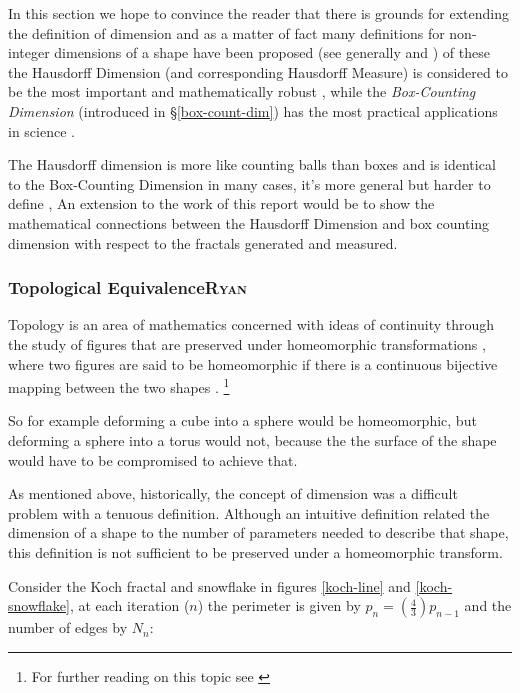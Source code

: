 \documentclass[a4paper,11pt,twoside]{article}
\begin{document}
In this section we hope to convince the reader that there is grounds for
extending the definition of dimension and as a matter of fact many definitions
for non-integer dimensions of a shape have been proposed (see generally
\cite[Ch. 39]{mandelbrotFractalGeometryNature1982} and
\cite[\S 1.3]{gouyetPhysicsFractalStructures1996}) of these the Hausdorff Dimension (and corresponding Hausdorff Measure) is
considered to be the most important and mathematically robust
\cite[p. 27]{falconerFractalGeometryMathematical2003b}, while the \emph{Box-Counting Dimension} (introduced in \S \ref{box-count-dim})
has the most practical applications in science
\cite[p. 192]{peitgenChaosFractalsNew2004}.

The Hausdorff dimension is more like counting balls than boxes and is identical
to the Box-Counting Dimension in many cases, it's more general but harder to define
\cite{sandersonFractalsAreTypically2017}, An extension to the work of this report
would be to show the mathematical connections between the Hausdorff Dimension
and box counting dimension with respect to the fractals generated and measured.


\subsubsection{Topological Equivalence\hfill{}\textsc{Ryan}}
\label{topological-equivalence}
Topology is an area of mathematics concerned with ideas of continuity through the study of figures that are preserved under homeomorphic transformations \cite{gilmoreTopologyChaosAlice2002} , where two figures are said to be homeomorphic if there is a continuous bijective mapping between the two shapes \cite[p. 105]{peitgenChaosFractalsNew2004}
.
\footnote{For further reading on this topic see \cite[p. 106]{peitgenChaosFractalsNew2004}}

So for example deforming a cube into a sphere would be homeomorphic, but deforming a sphere into a torus would not, because the the surface of the shape would have to be compromised to achieve that.

As mentioned above, historically, the concept of dimension was a difficult problem with a tenuous
definition.  Although an intuitive definition related the dimension of a shape to
the number of parameters needed to describe that shape, this definition is not
sufficient to be preserved under a homeomorphic transform.

Consider the Koch fractal and snowflake in figures \ref{koch-line} and \ref{koch-snowflake}, at each iteration (\(n\)) the perimeter is given by \(p_{n}= \left(\frac{4}{3} \right)p_{n-1}\) and the number of edges by \(N_{n}\):
\end{document}
